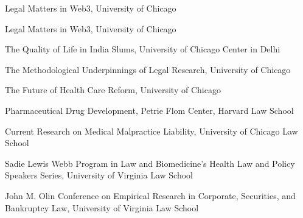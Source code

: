 \documentclass[11pt,letterpaper]{report}
\begin{document}



    \begin{tablist}

        \item[2024] \tab{}Legal Matters in Web3, University of Chicago
        \item[2023] \tab{}Legal Matters in Web3, University of Chicago
        \item[2018] \tab{}The Quality of Life in India Slums, University of Chicago Center in Delhi
        \item[2016] \tab{}The Methodological Underpinnings of Legal Research, University of Chicago
        \item[2013] \tab{}The Future of Health Care Reform, University of Chicago
        \item[2009] \tab{}Pharmaceutical Drug Development, Petrie Flom Center, Harvard Law School
        \item[2006] \tab{}Current Research on Medical Malpractice Liability, University of Chicago Law School
        \item[2003--05] \tab{}Sadie Lewis Webb Program in Law and Biomedicine’s Health Law and Policy Speakers Series, University of Virginia Law School
        \item[2004] \tab{}John M. Olin Conference on Empirical Research in Corporate, Securities, and Bankruptcy Law, University of Virginia Law School
        

    \end{tablist}

\end{document}
